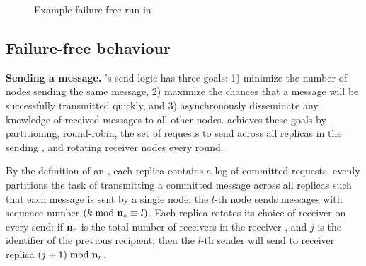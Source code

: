 \begin{figure}[t]
\begin{subfigure}[t]{0.494\columnwidth}
         \label{sfig:second}
     \end{subfigure}%
    \caption
    {Example failure-free run in \Scrooge{}}
    \label{fig:round-robin}
\end{figure}


\subsection{Failure-free behaviour}
\label{ss:failurefree}

\par \textbf{Sending a message.} \Scrooge{}'s send logic has three goals: 1) minimize the number of nodes sending the same message, 
2) maximize the chances that a message will be successfully transmitted quickly, 
and 3) asynchronously disseminate any knowledge of received messages to all other nodes. 
\Scrooge{} achieves these goals
by partitioning, round-robin, the set of requests to send across all replicas in the sending \RSM, 
and rotating receiver nodes  every round.

By the definition of an \RSM{}, each replica contains a log of committed requests. 
\Scrooge{} evenly partitions the task of transmitting a committed message across all replicas such that each message is sent by a single node: the $l$-th \Scrooge{} node sends messages with sequence number $(k \bmod \textbf{n}_{s} \equiv l)$. 
Each replica rotates its choice of receiver on every send: if $\textbf{n}_{r}$ is the total number of receivers in the receiver \RSM{}, 
and $j$ is the identifier of the previous recipient, then the $l$-th sender will send to receiver replica $(j+1) \bmod \textbf{n}_{r}$. 

